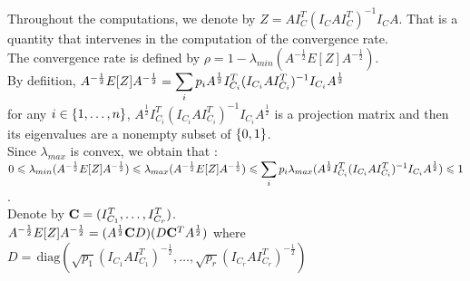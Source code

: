
 
 
Throughout the computations, we denote by $Z = A I_{C}^{T} (I_{C} A I_{C}^{T})^{-1} I_{C} A$. That is a quantity that intervenes in the computation of the convergence rate.\\

The convergence rate is defined by $\rho = 1 - \lambda_{min}(A^{-\frac12}E[Z]A^{-\frac12}  )$.\\

By defiition, $A^{-\frac12}E[Z]A^{-\frac12} = \displaystyle\sum\limits_{i} p_{i} A^{\frac 12} I_{C_{i}}^{T} (I_{C_{i}}  A  I_{C_{i}}^{T})^{-1} I_{C_{i}} A^{\frac 12}$ \\

for any $i \in \left\{1,\dots,n\right\}$, $A^{\frac 12} I_{C_{i}}^{T} (I_{C_{i}}  A  I_{C_{i}}^{T})^{-1} I_{C_{i}} A^{\frac 12}$ is a projection matrix and then its eigenvalues are a nonempty subset of $\left\{0,1\right\}$.\\

Since $\lambda_{max}$ is convex, we obtain that :\\

$0 \leqslant \lambda_{min}(A^{-\frac12}E[Z]A^{-\frac12}) \leqslant  \lambda_{max}(A^{-\frac12}E[Z]A^{-\frac12}) \leqslant \displaystyle\sum\limits_{i} p_{i} \lambda_{max}(A^{\frac 12} I_{C_{i}}^{T} (I_{C_{i}}  A  I_{C_{i}}^{T})^{-1} I_{C_{i}} A^{\frac 12}) \leqslant 1$.\\

Denote by $\bold{C} = (I_{C_{1}}^{T},\dots,I_{C_{r}}^{T})$.\\

$A^{-\frac12}E[Z]A^{-\frac12} = (A^{\frac 12} \bold{C} D)(D \bold{C}^{T} A^{\frac 12})$ where $D =  \,\text{diag}(\sqrt{p_{1}} (I_{C_{1}}A I_{C_{1}}^{T})^{-\frac 12},\dots, \sqrt{p_{r}}(I_{C_{r}} A I_{C_{r}}^{T})^{-\frac 12})$
 
 
\pr 

